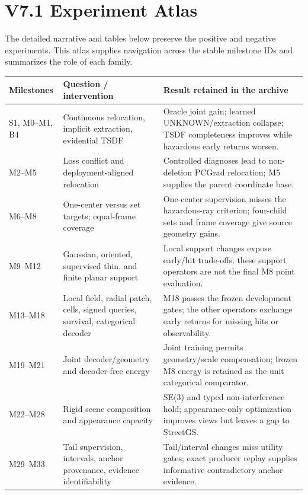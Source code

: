 \section{V7.1 Experiment Atlas}
\label{sec:archive-atlas}

The detailed narrative and tables below preserve the positive and negative experiments.
This atlas supplies navigation across the stable milestone IDs and summarizes the role of each family.

\begin{table}[t]
\centering\small
\setlength{\tabcolsep}{5pt}
\begin{tabular}{p{}p{}p{}}
\toprule
Milestones & Question / intervention & Result retained in the archive\\
\midrule
S1, M0--M1, B4 & Continuous relocation, implicit extraction, evidential TSDF &
Oracle joint gain; learned UNKNOWN/extraction collapse; TSDF completeness improves while hazardous early returns worsen.\\
M2--M5 & Loss conflict and deployment-aligned relocation &
Controlled diagnoses lead to non-deletion PCGrad relocation; M5 supplies the parent coordinate base.\\
M6--M8 & One-center versus set targets; equal-frame coverage &
One-center supervision misses the hazardous-ray criterion; four-child sets and frame coverage give source geometry gains.\\
M9--M12 & Gaussian, oriented, supervised thin, and finite planar support &
Local support changes expose early/hit trade-offs; these support operators are not the final M8 point evaluation.\\
M13--M18 & Local field, radial patch, cells, signed queries, survival, categorical decoder &
M18 passes the frozen development gates; the other operators exchange early returns for missing hits or observability.\\
M19--M21 & Joint decoder/geometry and decoder-free energy &
Joint training permits geometry/scale compensation; frozen M8 energy is retained as the unit categorical comparator.\\
M22--M28 & Rigid scene composition and appearance capacity &
SE(3) and typed non-interference hold; appearance-only optimization improves views but leaves a gap to StreetGS.\\
M29--M33 & Tail supervision, intervals, anchor provenance, evidence identifiability &
Tail/interval changes miss utility gates; exact producer replay supplies informative contradictory anchor evidence.\\

\end{tabular}
\end{table}
